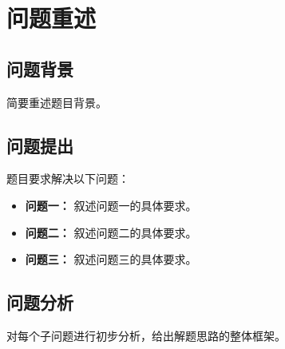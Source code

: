 \section{问题重述}

\subsection{问题背景}
简要重述题目背景。

\subsection{问题提出}
题目要求解决以下问题：
\begin{itemize}
    \item \textbf{问题一：} 叙述问题一的具体要求。
    \item \textbf{问题二：} 叙述问题二的具体要求。
    \item \textbf{问题三：} 叙述问题三的具体要求。
\end{itemize}

\subsection{问题分析}
对每个子问题进行初步分析，给出解题思路的整体框架。
